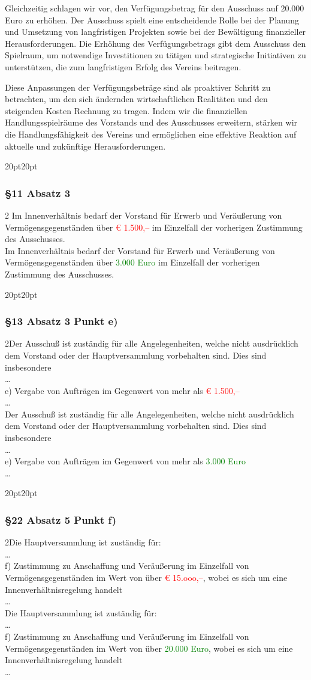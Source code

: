 \documentclass[10pt,a4paper,parskip=half]{scrartcl}
\newcommand{\new}[1]{\textcolor{Green}{#1}}
\newcommand{\old}[1]{\textcolor{Red}{#1}}
\newcommand{\change}[1]{
  \begin{adjustwidth}{20pt}{20pt}
    #1
  \end{adjustwidth}
}
\newcommand{\compare}[3]{\change{\subsubsection*{#1}\begin{multicols}{2}#2\columnbreak\\#3\end{multicols}}}
\begin{document}
  Gleichzeitig schlagen wir vor, den Verfügungsbetrag für den Ausschuss auf 20.000 Euro zu erhöhen. Der Ausschuss spielt eine entscheidende Rolle bei der Planung und Umsetzung von langfristigen Projekten sowie bei der Bewältigung finanzieller Herausforderungen. Die Erhöhung des Verfügungsbetrags gibt dem Ausschuss den Spielraum, um notwendige Investitionen zu tätigen und strategische Initiativen zu unterstützen, die zum langfristigen Erfolg des Vereins beitragen.
  
  Diese Anpassungen der Verfügungsbeträge sind als proaktiver Schritt zu betrachten, um den sich ändernden wirtschaftlichen Realitäten und den steigenden Kosten Rechnung zu tragen. Indem wir die finanziellen Handlungsspielräume des Vorstands und des Ausschusses erweitern, stärken wir die Handlungsfähigkeit des Vereins und ermöglichen eine effektive Reaktion auf aktuelle und zukünftige Herausforderungen.

  \compare{§11 Absatz 3}{
    Im Innenverhältnis bedarf der Vorstand für Erwerb und Veräußerung von Vermögensgegenständen über \old{€ 1.500,--} im Einzelfall der vorherigen Zustimmung des Ausschusses.
  }{Im Innenverhältnis bedarf der Vorstand für Erwerb und Veräußerung von Vermögensgegenständen über \new{3.000 Euro} im Einzelfall der vorherigen Zustimmung des Ausschusses.}

  \compare{§13 Absatz 3 Punkt e)}
  {Der Ausschuß ist zuständig für alle Angelegenheiten, welche nicht ausdrücklich dem
    Vorstand oder der Hauptversammlung vorbehalten sind. Dies sind insbesondere\\\dots\\
  e) Vergabe von Aufträgen im Gegenwert von mehr als \old{€ 1.500,--}\\\dots}
  {Der Ausschuß ist zuständig für alle Angelegenheiten, welche nicht ausdrücklich dem
    Vorstand oder der Hauptversammlung vorbehalten sind. Dies sind insbesondere\\\dots\\
    e) Vergabe von Aufträgen im Gegenwert von mehr als \new{3.000 Euro}\\\dots}

  \compare{§22 Absatz 5 Punkt f)}
  {Die Hauptversammlung ist zuständig für: \\ \dots\\
    f) Zustimmung zu Anschaffung und Veräußerung im Einzelfall von Vermögensgegenständen im Wert von über \old{€ 15.ooo,--}, wobei es sich um eine Innenverhältnisregelung handelt\\\dots}
  {Die Hauptversammlung ist zuständig für: \\ \dots\\f) Zustimmung zu Anschaffung und Veräußerung im Einzelfall von Vermögensgegenständen im Wert von über \new{20.000 Euro}, wobei es sich um eine Innenverhältnisregelung handelt\\\dots}
\end{document}

